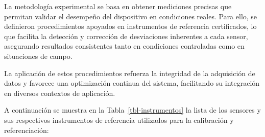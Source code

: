 \documentclass[
  letterpaper,
]{scrbook}
\begin{document}
La metodología experimental se basa en obtener mediciones precisas que
permitan validar el desempeño del dispositivo en condiciones reales.
Para ello, se definieron procedimientos apoyados en instrumentos de
referencia certificados, lo que facilita la detección y corrección de
desviaciones inherentes a cada sensor, asegurando resultados
consistentes tanto en condiciones controladas como en situaciones de
campo.

La aplicación de estos procedimientos refuerza la integridad de la
adquisición de datos y favorece una optimización continua del sistema,
facilitando su integración en diversos contextos de aplicación.

A continuación se muestra en la Tabla~\ref{tbl-instrumentos} la lista de
los sensores y sus respectivos instrumentos de referencia utilizados
para la calibración y referenciación:
\end{document}
